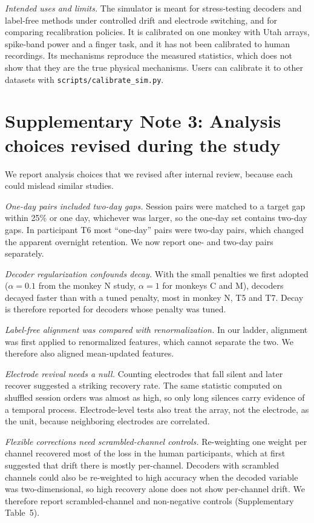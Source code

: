 \documentclass[pdflatex,sn-nature]{sn-jnl}
\begin{document}
\textit{Intended uses and limits.} The simulator is meant for stress-testing decoders and label-free methods under
controlled drift and electrode switching, and for comparing recalibration policies. It is calibrated on one monkey
with Utah arrays, spike-band power and a finger task, and it has not been calibrated to human recordings. Its mechanisms reproduce the measured statistics, which does not show that they are the true
physical mechanisms. Users can calibrate it to other datasets with \texttt{scripts/calibrate\_sim.py}.

\section*{Supplementary Note 3: Analysis choices revised during the study}

We report analysis choices that we revised after internal review, because each could mislead similar studies.

\textit{One-day pairs included two-day gaps.} Session pairs were matched to a target gap within 25\% or one day,
whichever was larger, so the one-day set contains two-day gaps. In participant T6 most ``one-day'' pairs were two-day
pairs, which changed the apparent overnight retention. We now report one- and two-day pairs separately.

\textit{Decoder regularization confounds decay.} With the small penalties we first adopted ($\alpha = 0.1$ from the
monkey N study, $\alpha = 1$ for monkeys C and M), decoders decayed faster than with a tuned penalty, most in monkey N,
T5 and T7. Decay is therefore reported for decoders whose penalty
was tuned.

\textit{Label-free alignment was compared with renormalization.} In our ladder, alignment was first applied to
renormalized features, which cannot separate the two. We therefore also aligned mean-updated features.

\textit{Electrode revival needs a null.} Counting electrodes that fall silent and later recover suggested a striking
recovery rate. The same statistic computed on shuffled session orders was almost as high, so only long silences carry
evidence of a temporal process. Electrode-level tests also treat the array, not the electrode, as the unit, because
neighboring electrodes are correlated.

\textit{Flexible corrections need scrambled-channel controls.} Re-weighting one weight per channel recovered most
of the loss in the human participants, which at first suggested that drift there is mostly per-channel. Decoders
with scrambled channels could also be re-weighted to high accuracy when the decoded variable was two-dimensional,
so high recovery alone does not show per-channel drift. We therefore report scrambled-channel and non-negative
controls (Supplementary Table~5).
\end{document}
